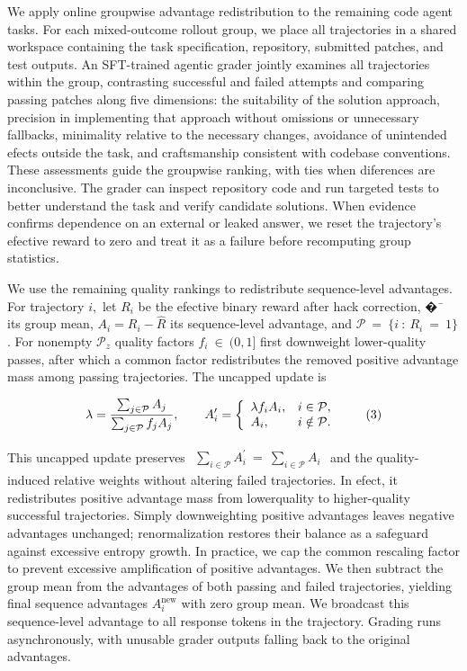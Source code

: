 \documentclass[
  10
]{article}
\newcounter{none} %
\begin{document}
We apply online groupwise advantage redistribution to the remaining code
agent tasks. For each mixed-outcome rollout group, we place all
trajectories in a shared workspace containing the task specification,
repository, submitted patches, and test outputs. An SFT-trained agentic
grader jointly examines all trajectories within the group, contrasting
successful and failed attempts and comparing passing patches along five
dimensions: the suitability of the solution approach, precision in
implementing that approach without omissions or unnecessary fallbacks,
minimality relative to the necessary changes, avoidance of unintended
efects outside the task, and craftsmanship consistent with codebase
conventions. These assessments guide the groupwise ranking, with ties
when diferences are inconclusive. The grader can inspect repository code
and run targeted tests to better understand the task and verify
candidate solutions. When evidence confirms dependence on an external or
leaked answer, we reset the trajectory's efective reward to zero and
treat it as a failure before recomputing group statistics.

We use the remaining quality rankings to redistribute sequence-level
advantages. For trajectory \(i ,\) let \(R _ { i }\) be the efective
binary reward after hack correction, �¯ its group mean,
\(A _ { i } = R _ { i } - \hat { R }\) its sequence-level advantage, and
\(\mathcal { P } \ = \ \{ i \ : \ R _ { i } \ = \ 1 \}\) . For nonempty
\(\mathcal { P } _ { z }\) quality factors
\(f _ { i } ~ \in ~ ( 0 , 1 ]\) first downweight lower-quality passes,
after which a common factor redistributes the removed positive advantage
mass among passing trajectories. The uncapped update is

\[
\lambda = \frac { \sum _ { j \in \mathcal { P } } A _ { j } } { \sum _ { j \in \mathcal { P } } f _ { j } A _ { j } } , \qquad A _ { i } ^ { \prime } = \left\{ \begin{array} { l l } { \lambda f _ { i } A _ { i } , } & { i \in \mathcal { P } , } \\ { A _ { i } , } & { i \notin \mathcal { P } . } \end{array} \right.\tag{3}
\]

This uncapped update preserves
\(\begin{array} { r } { \sum _ { i \in \mathcal { P } } A _ { i } ^ { \prime } \ = \ \sum _ { i \in \mathcal { P } } A _ { i } } \end{array}\)
and the quality-induced relative weights without altering failed
trajectories. In efect, it redistributes positive advantage mass from
lowerquality to higher-quality successful trajectories. Simply
downweighting positive advantages leaves negative advantages unchanged;
renormalization restores their balance as a safeguard against excessive
entropy growth. In practice, we cap the common rescaling factor to
prevent excessive amplification of positive advantages. We then subtract
the group mean from the advantages of both passing and failed
trajectories, yielding final sequence advantages
\(A _ { i } ^ { \mathrm { n e w } }\) with zero group mean. We broadcast
this sequence-level advantage to all response tokens in the trajectory.
Grading runs asynchronously, with unusable grader outputs falling back
to the original advantages.
\end{document}
